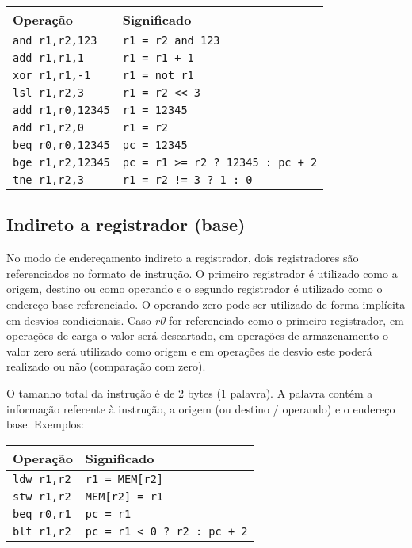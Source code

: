 \documentclass[11pt,a4paper]{report}
\begin{document}
\begin{table}[htb!]
\centering
\begin{tabular}{|p{5.0cm}|p{8.0cm}|}
\hline
\bf{Operação} & \bf{Significado} \\ \hline \hline
\texttt{and r1,r2,123} & \verb|r1 = r2 and 123| \\ \hline
\texttt{add r1,r1,1} & \verb|r1 = r1 + 1| \\ \hline
\texttt{xor r1,r1,-1} & \verb|r1 = not r1| \\ \hline
\texttt{lsl r1,r2,3} & \verb|r1 = r2 << 3| \\ \hline
\texttt{add r1,r0,12345} & \verb|r1 = 12345| \\ \hline
\texttt{add r1,r2,0} & \verb|r1 = r2| \\ \hline
\texttt{beq r0,r0,12345} & \verb|pc = 12345| \\ \hline
\texttt{bge r1,r2,12345} & \verb|pc = r1 >= r2 ? 12345 : pc + 2| \\ \hline
\texttt{tne r1,r2,3} & \verb|r1 = r2 != 3 ? 1 : 0| \\ \hline
\end{tabular}
\end{table}

\subsection{Indireto a registrador (base)}

No modo de endereçamento indireto a registrador, dois registradores são
referenciados no formato de instrução. O primeiro registrador é utilizado
como a origem, destino ou como operando e o segundo registrador é
utilizado como o endereço base referenciado. O operando zero pode ser
utilizado de forma implícita em desvios condicionais. Caso \textit{r0}
for referenciado como o primeiro registrador, em operações de carga o
valor será descartado, em operações de armazenamento o valor zero será
utilizado como origem e em operações de desvio este poderá realizado ou
não (comparação com zero).

O tamanho total da instrução é de 2 bytes (1 palavra). A palavra contém
a informação referente à instrução, a origem (ou destino / operando) e o
endereço base. Exemplos:

\begin{table}[htb!]
\centering
\begin{tabular}{|p{5.0cm}|p{8.0cm}|}
\hline
\bf{Operação} & \bf{Significado} \\ \hline \hline
\texttt{ldw r1,r2} & \verb|r1 = MEM[r2]| \\ \hline
\texttt{stw r1,r2} & \verb|MEM[r2] = r1| \\ \hline
\texttt{beq r0,r1} & \verb|pc = r1| \\ \hline
\texttt{blt r1,r2} & \verb|pc = r1 < 0 ? r2 : pc + 2| \\ \hline
\end{tabular}
\end{table}
\end{document}
